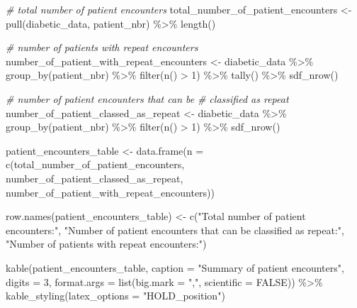 \documentclass[
]{article}
\newenvironment{Shaded}{\begin{snugshade}}{\end{snugshade}}
\newcommand{\AttributeTok}[1]{\textcolor[rgb]{0.77,0.63,0.00}{#1}}
\newcommand{\CommentTok}[1]{\textcolor[rgb]{0.56,0.35,0.01}{\textit{#1}}}
\newcommand{\ConstantTok}[1]{\textcolor[rgb]{0.00,0.00,0.00}{#1}}
\newcommand{\DecValTok}[1]{\textcolor[rgb]{0.00,0.00,0.81}{#1}}
\newcommand{\FunctionTok}[1]{\textcolor[rgb]{0.00,0.00,0.00}{#1}}
\newcommand{\NormalTok}[1]{#1}
\newcommand{\OtherTok}[1]{\textcolor[rgb]{0.56,0.35,0.01}{#1}}
\newcommand{\SpecialCharTok}[1]{\textcolor[rgb]{0.00,0.00,0.00}{#1}}
\newcommand{\StringTok}[1]{\textcolor[rgb]{0.31,0.60,0.02}{#1}}
\begin{document}
\begin{Shaded}
\begin{Highlighting}[]
\CommentTok{\# total number of patient encounters}
\NormalTok{total\_number\_of\_patient\_encounters }\OtherTok{\textless{}{-}} \FunctionTok{pull}\NormalTok{(diabetic\_data,}
\NormalTok{    patient\_nbr) }\SpecialCharTok{\%\textgreater{}\%}
    \FunctionTok{length}\NormalTok{()}

\CommentTok{\# number of patients with repeat encounters}
\NormalTok{number\_of\_patient\_with\_repeat\_encounters }\OtherTok{\textless{}{-}}\NormalTok{ diabetic\_data }\SpecialCharTok{\%\textgreater{}\%}
    \FunctionTok{group\_by}\NormalTok{(patient\_nbr) }\SpecialCharTok{\%\textgreater{}\%}
    \FunctionTok{filter}\NormalTok{(}\FunctionTok{n}\NormalTok{() }\SpecialCharTok{\textgreater{}} \DecValTok{1}\NormalTok{) }\SpecialCharTok{\%\textgreater{}\%}
    \FunctionTok{tally}\NormalTok{() }\SpecialCharTok{\%\textgreater{}\%}
    \FunctionTok{sdf\_nrow}\NormalTok{()}

\CommentTok{\# number of patient encounters that can be}
\CommentTok{\# classified as \textquotesingle{}repeat\textquotesingle{}}
\NormalTok{number\_of\_patient\_classed\_as\_repeat }\OtherTok{\textless{}{-}}\NormalTok{ diabetic\_data }\SpecialCharTok{\%\textgreater{}\%}
    \FunctionTok{group\_by}\NormalTok{(patient\_nbr) }\SpecialCharTok{\%\textgreater{}\%}
    \FunctionTok{filter}\NormalTok{(}\FunctionTok{n}\NormalTok{() }\SpecialCharTok{\textgreater{}} \DecValTok{1}\NormalTok{) }\SpecialCharTok{\%\textgreater{}\%}
    \FunctionTok{sdf\_nrow}\NormalTok{()}

\NormalTok{patient\_encounters\_table }\OtherTok{\textless{}{-}} \FunctionTok{data.frame}\NormalTok{(}\AttributeTok{n =} \FunctionTok{c}\NormalTok{(total\_number\_of\_patient\_encounters,}
\NormalTok{    number\_of\_patient\_classed\_as\_repeat, number\_of\_patient\_with\_repeat\_encounters))}

\FunctionTok{row.names}\NormalTok{(patient\_encounters\_table) }\OtherTok{\textless{}{-}} \FunctionTok{c}\NormalTok{(}\StringTok{"Total number of patient encounters:"}\NormalTok{,}
    \StringTok{"Number of patient encounters that can be classified as \textquotesingle{}repeat\textquotesingle{}:"}\NormalTok{,}
    \StringTok{"Number of patients with repeat encounters:"}\NormalTok{)}

\FunctionTok{kable}\NormalTok{(patient\_encounters\_table, }\AttributeTok{caption =} \StringTok{"Summary of patient encounters"}\NormalTok{,}
    \AttributeTok{digits =} \DecValTok{3}\NormalTok{, }\AttributeTok{format.args =} \FunctionTok{list}\NormalTok{(}\AttributeTok{big.mark =} \StringTok{","}\NormalTok{,}
        \AttributeTok{scientific =} \ConstantTok{FALSE}\NormalTok{)) }\SpecialCharTok{\%\textgreater{}\%}
    \FunctionTok{kable\_styling}\NormalTok{(}\AttributeTok{latex\_options =} \StringTok{"HOLD\_position"}\NormalTok{)}
\end{Highlighting}
\end{Shaded}
\end{document}
